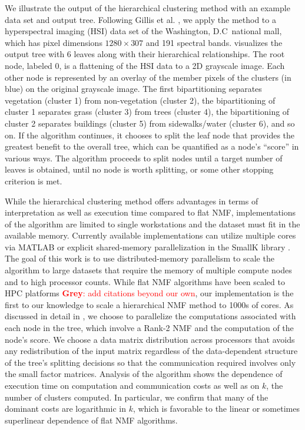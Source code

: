 \documentclass[conference,compsoc]{IEEEtran}
\newcommand{\GB}[1]{\textcolor{red}{\textbf{Grey}: #1}}
\begin{document}
We illustrate the output of the hierarchical clustering method with an example data set and output tree.
Following Gillis et al. \cite{GKP15}, we apply the method to a hyperspectral imaging (HSI) data set of the Washington, D.C~national mall, which has pixel dimensions $1280 \times 307$ and 191 spectral bands.
 visualizes the output tree with 6 leaves along with their hierarchical relationships.
The root node, labeled 0, is a flattening of the HSI data to a 2D grayscale image.
Each other node is represented by an overlay of the member pixels of the clusters (in blue) on the original grayscale image.
The first bipartitioning separates vegetation (cluster 1) from non-vegetation (cluster 2), the bipartitioning of cluster 1 separates grass (cluster 3) from trees (cluster 4), the bipartitioning of cluster 2 separates buildings (cluster 5) from sidewalks/water (cluster 6), and so on.
If the algorithm continues, it chooses to split the leaf node that provides the greatest benefit to the overall tree, which can be quantified as a node's ``score'' in various ways.
The algorithm proceeds to split nodes until a target number of leaves is obtained, until no node is worth splitting, or some other stopping criterion is met.

While the hierarchical clustering method offers advantages in terms of interpretation as well as execution time compared to flat NMF, implementations of the algorithm are limited to single workstations and the dataset must fit in the available memory.
Currently available implementations can utilize multiple cores via MATLAB \cite{KP13} or explicit shared-memory parallelization in the SmallK library \cite{SmallK}.
The goal of this work is to use distributed-memory parallelism to scale the algorithm to large datasets that require the memory of multiple compute nodes and to high processor counts.
While flat NMF algorithms have been scaled to HPC platforms \cite{FKPB15} \GB{add citations beyond our own}, our implementation is the first to our knowledge to scale a hierarchical NMF method to 1000s of cores. 
As discussed in detail in , we choose to parallelize the computations associated with each node in the tree, which involve a Rank-2 NMF and the computation of the node's score.
We choose a data matrix distribution across processors that avoids any redistribution of the input matrix regardless of the data-dependent structure of the tree's splitting decisions so that the communication required involves only the small factor matrices.
Analysis of the algorithm shows the dependence of execution time on computation and communication costs as well as on $k$, the number of clusters computed.
In particular, we confirm that many of the dominant costs are logarithmic in $k$, which is favorable to the linear or sometimes superlinear dependence of flat NMF algorithms.
\end{document}
